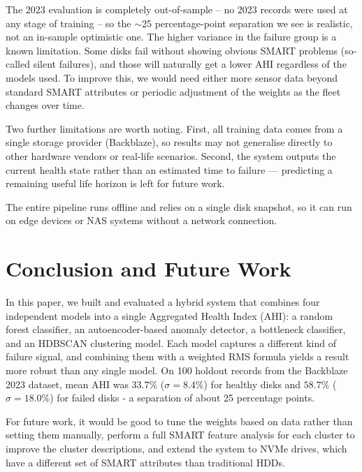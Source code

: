 \documentclass[sigconf,natbib=false]{acmart}
\begin{document}
The 2023 evaluation is completely out-of-sample -- no 2023 records were used at any stage of training -- so the $\sim$25 percentage-point separation we see is realistic, not an in-sample optimistic one. The higher variance in the failure group is a known limitation. Some disks fail without showing obvious SMART problems (so-called silent failures), and those will naturally get a lower AHI regardless of the models used. To improve this, we would need either more sensor data beyond standard SMART attributes or periodic adjustment of the weights as the fleet changes over time.

Two further limitations are worth noting. First, all training data comes from a single storage provider (Backblaze), so results may not generalise directly to other hardware vendors or real-life scenarios. Second, the system outputs the current health state rather than an estimated time to failure — predicting a remaining useful life horizon is left for future work.

The entire pipeline runs offline and relies on a single disk snapshot, so it can run on edge devices or NAS systems without a network connection.

\section{Conclusion and Future Work}
\label{sec:conclusion}

In this paper, we built and evaluated a hybrid system that combines four independent models into a single Aggregated Health Index (AHI): a random forest classifier, an autoencoder-based anomaly detector, a bottleneck classifier, and an HDBSCAN clustering model. Each model captures a different kind of failure signal, and combining them with a weighted RMS formula yields a result more robust than any single model. On 100 holdout records from the Backblaze 2023 dataset, mean AHI was $33.7\%$ ($\sigma = 8.4\%$) for healthy disks and $58.7\%$ ($\sigma = 18.0\%$) for failed disks - a separation of about 25 percentage points.

For future work, it would be good to tune the weights based on data rather than setting them manually, perform a full SMART feature analysis for each cluster to improve the cluster descriptions, and extend the system to NVMe drives, which have a different set of SMART attributes than traditional HDDs.

\printbibliography
\end{document}
